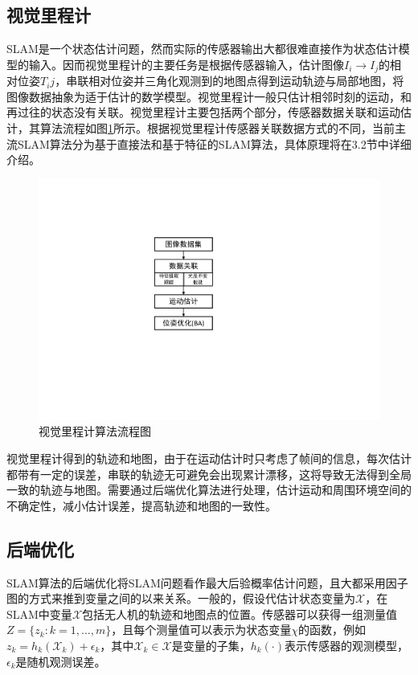 \subsection{视觉里程计}
SLAM是一个状态估计问题，然而实际的传感器输出大都很难直接作为状态估计模型的输入。因而视觉里程计的主要任务是根据传感器输入，估计图像$I_i \rightarrow I_j$的相对位姿$T_ij$，串联相对位姿并三角化观测到的地图点得到运动轨迹与局部地图，将图像数据抽象为适于估计的数学模型。视觉里程计一般只估计相邻时刻的运动，和再过往的状态没有关联。视觉里程计主要包括两个部分，传感器数据关联和运动估计\upcite{[1.39]}，其算法流程如图\ref{fig3.2}所示。根据视觉里程计传感器关联数据方式的不同，当前主流SLAM算法分为基于直接法和基于特征的SLAM算法，具体原理将在3.2节中详细介绍。

\begin{figure}[h]
\centering
\includegraphics[scale=0.7,angle=-90]{figures/Fig3-2.pdf}
\caption{视觉里程计算法流程图}
\label{fig3.2}
\end{figure}

视觉里程计得到的轨迹和地图，由于在运动估计时只考虑了帧间的信息，每次估计都带有一定的误差，串联的轨迹无可避免会出现累计漂移，这将导致无法得到全局一致的轨迹与地图。需要通过后端优化算法进行处理，估计运动和周围环境空间的不确定性，减小估计误差，提高轨迹和地图的一致性。


\subsection{后端优化}
SLAM算法的后端优化将SLAM问题看作最大后验概率估计问题，且大都采用因子图的方式来推到变量之间的以来关系\upcite{[3.2]}。一般的，假设代估计状态变量为$\mathcal{X}$，在SLAM中变量$\mathcal{X}$包括无人机的轨迹和地图点的位置。传感器可以获得一组测量值$Z=\lbrace z_k:k=1,\ldots ,m\rbrace$，且每个测量值可以表示为状态变量$\chi$的函数，例如$z_k=h_k\left( \mathcal{X}_k \right)+\epsilon_k$，其中$\mathcal{X}_k \in \mathcal{X}$是变量的子集，$h_k(\cdot)$表示传感器的观测模型，$\epsilon_k$是随机观测误差。

